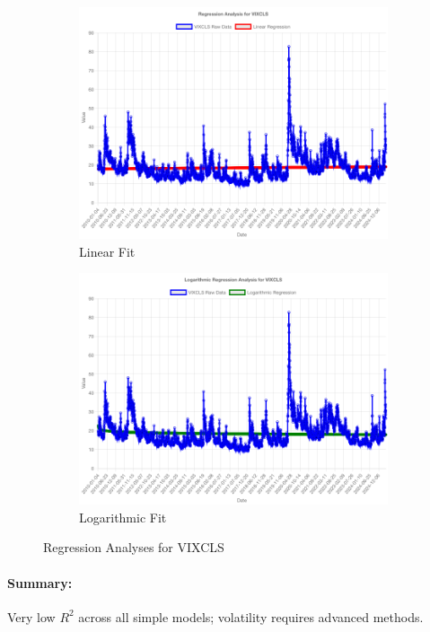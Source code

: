 \documentclass[11pt,a4paper]{article}
\begin{document}
\begin{figure}[htbp]
  \centering
  \begin{subfigure}[b]{0.48\textwidth}
    \includegraphics[width=\textwidth]{backend/analyses/VIXCLS_analysis.png}
    \caption{Linear Fit}
  \end{subfigure}
  \hfill
  \begin{subfigure}[b]{0.48\textwidth}
    \includegraphics[width=\textwidth]{backend/analyses/VIXCLS_log_analysis.png}
    \caption{Logarithmic Fit}
  \end{subfigure}
  \caption{Regression Analyses for VIXCLS}
\end{figure}

\paragraph{Summary:}
Very low \(R^2\) across all simple models; volatility requires advanced methods.
\end{document}
